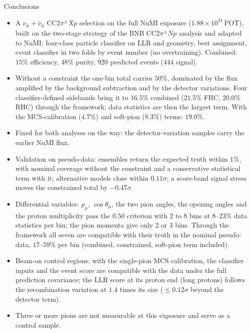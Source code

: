 \documentclass[aspectratio=169,10pt]{beamer}
\newcommand{\pot}{\,\text{POT}}
\begin{document}
\begin{frame}{Conclusions}
  \begin{itemize}\footnotesize\setlength\itemsep{3pt}
    \item A $\nu_\mu+\bar\nu_\mu$ CC$2\pi^\pm Xp$ selection on the full NuMI exposure
          ($1.88\times10^{21}\pot$), built on the two-stage strategy of the BNB CC$2\pi^\pm Np$ analysis and
          adapted to NuMI: four-class particle classifier on LLR and geometry, best assignment, event
          classifier in two folds by event number (no overtraining). Combined: $15\%$ efficiency, $48\%$ purity, $920$ predicted events ($444$ signal).
    \item Without a constraint the one-bin total carries $50\%$, dominated by the flux amplified by the
          background subtraction and by the detector variations. Four classifier-defined sidebands bring it
          to $16.5\%$ combined ($21.5\%$ FHC, $20.0\%$ RHC) through the framework; data statistics are then
          the largest term. With the MCS-calibration ($4.7\%$) and soft-pion ($8.3\%$) terms: $19.0\%$.
    \item Fixed for both analyses on the way: the detector-variation samples carry the earlier NuMI flux.
    \item Validation on pseudo-data: ensembles return the expected truth within $1\%$, with nominal coverage
          without the constraint and a conservative statistical term with it; alternative models close within
          $0.11\sigma$; a score-band signal stress moves the constrained total by $-0.47\sigma$.
    \item Differential variables: $p_\mu$, $\cos\theta_\mu$, the two pion angles, the opening angles and the proton
          multiplicity pass the $0.50$ criterion with 2 to 8 bins at $8$--$23\%$ data statistics per bin; the
          pion momenta give only 2 or 3 bins. Through the framework all seven are compatible with their truth in the
          nominal pseudo-data, $17$--$59\%$ per bin (combined, constrained, soft-pion term included).
    \item Beam-on control regions: with the single-pion MCS calibration, the classifier inputs and the event score
          are compatible with the data under the full prediction covariance; the LLR score at its proton end (long protons) follows the
          recombination variation at $1.4$ times its size ($\leq0.12\sigma$ beyond the detector term).
    \item Three or more pions are not measurable at this exposure and serve as a control sample.
  \end{itemize}
  \label{mainend}
\end{frame}
\end{document}
